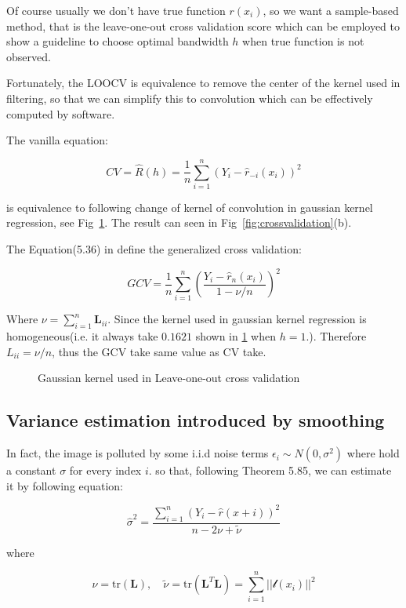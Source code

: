 \documentclass{article}
\begin{document}
Of course usually we don't have true function $r(x_i)$, so we want a sample-based method, 
that is the leave-one-out cross validation score which can be employed to show a guideline to choose optimal bandwidth $h$
when true function is not observed.

Fortunately, the LOOCV is equivalence to remove the center of the kernel used in filtering, so that we can simplify this to 
convolution which can be effectively computed by software.

The vanilla equation:

$$
CV = \hat{R}(h)=\frac{1}{n}\sum_{i=1}^n (Y_i-\hat{r}_{-i}(x_i))^2
$$

is equivalence to following change of kernel of convolution in gaussian kernel regression, see Fig~\ref{fig:gaussian_kernel}. 
The result can seen in Fig~\ref{fig:crossvalidation}(b).

The Equation(5.36) in \cite{wasserman2006all} define the generalized cross validation:

$$
GCV = \frac{1}{n}\sum_{i=1}^n \left(\frac{Y_i-\hat{r}_n(x_i)}{1-\nu/n}\right)^2
$$

Where $\nu = \sum_{i=1}^n \mathbf{L}_{ii}$. Since the kernel used in gaussian kernel regression is homogeneous(i.e. it always take $0.1621$
shown in \ref{fig:gaussian_kernel} when $h=1$.). Therefore $L_{ii} = \nu/n$, thus the GCV take same value as CV take. 

\begin{figure}[htb]
  \centering
  
  \caption{Gaussian kernel used in Leave-one-out cross validation}
  \label{fig:gaussian_kernel}
\end{figure}


\subsection{Variance estimation introduced by smoothing}

In fact, the image is polluted by some i.i.d noise terms $\epsilon_i \sim N(0,\sigma^2)$ where hold a constant $\sigma$ for every index $i$.
so that, following \cite{wasserman2006all} Theorem 5.85, we can estimate it by following equation:

$$
\hat{\sigma}^2=\frac{\sum_{i=1}^n (Y_i-\hat{r}(x+i))^2}{n-2\nu+\tilde{\nu}}
$$

where

$$
\nu = \mathrm{tr}(\mathbf{L}), \quad \tilde{\nu}=\mathrm{tr}(\mathbf{L}^T\mathbf{L})=\sum_{i=1}^n||\mathcal{l}(x_i)||^2
$$
\end{document}
